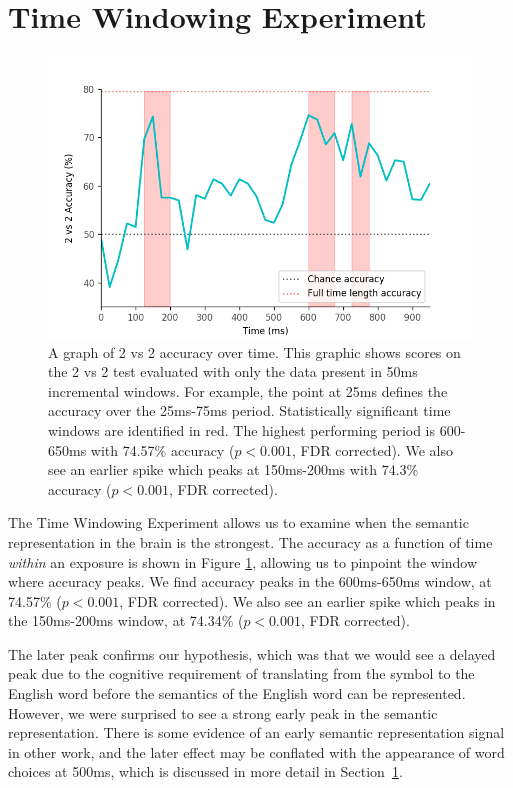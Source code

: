 \section{Time Windowing Experiment}
\label{sec:results:timewindowing}

\begin{figure}[t]
  \centering
  \includegraphics[width=0.75\linewidth]{figures/timewindow}
  \caption[\tvt Accuracy over Time]{
    A graph of 2 vs 2 accuracy over time. This graphic shows scores on the 2 vs 
    2 test evaluated with only the data present in 50ms incremental windows.  
    For example, the point at 25ms defines the \tvt accuracy over the 25ms-75ms 
    period. Statistically significant time windows are identified in red. The 
    highest performing period is 600-650ms with 74.57\% accuracy ($p < 0.001$, 
    FDR corrected). We also see an earlier spike which peaks at 150ms-200ms 
    with 74.3\% accuracy ($p < 0.001$, FDR corrected).
  }
  \label{fig:timewindow}
\end{figure}

The Time Windowing Experiment allows us to examine when the semantic 
representation in the brain is the strongest. The \tvt accuracy as a function 
of time \emph{within} an exposure is shown in Figure \ref{fig:timewindow}, 
allowing us to pinpoint the window where accuracy peaks. We find accuracy peaks 
in the 600ms-650ms window, at 74.57\% ($p < 0.001$, FDR corrected). We also see 
an earlier spike which peaks in the 150ms-200ms window, at 74.34\% ($p < 
0.001$, FDR corrected).

The later peak confirms our hypothesis, which was that we would see a delayed
peak due to the cognitive requirement of translating from the symbol to the 
English word before the semantics of the English word can be represented.  
However, we were surprised to see a strong early peak in the semantic 
representation. There is some evidence of an early semantic representation 
signal in other work, and the later effect may be conflated with the appearance 
of word choices at 500ms, which is discussed in more detail in 
Section~\ref{sec:results:timewindowing}.
